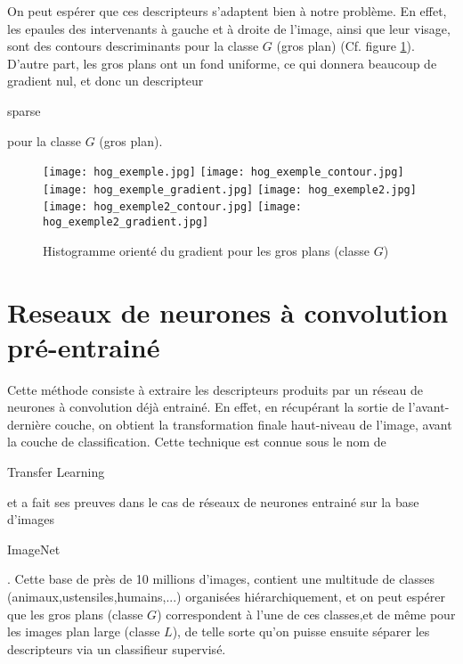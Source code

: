 \documentclass{book}
\begin{document}
On peut espérer que ces descripteurs s'adaptent bien à notre problème. En effet, les epaules des intervenants à gauche 
et à droite de l'image, ainsi que leur visage, sont des contours descriminants pour la classe $G$ (gros plan)
(Cf. figure \ref{hog_classeG}). D'autre part, les gros plans ont un fond uniforme, 
ce qui donnera beaucoup de gradient nul, et donc un descripteur \begin{itshape}sparse\end{itshape} pour la classe $G$ (gros plan).

\begin{figure}[H]
\begin{center}
\texttt{[image: hog\_exemple.jpg]}
\texttt{[image: hog\_exemple\_contour.jpg]}
\texttt{[image: hog\_exemple\_gradient.jpg]}
\texttt{[image: hog\_exemple2.jpg]}
\texttt{[image: hog\_exemple2\_contour.jpg]}
\texttt{[image: hog\_exemple2\_gradient.jpg]}
\end{center}
\caption{Histogramme orienté du gradient pour les gros plans (classe $G$)}
\label{hog_classeG}
\end{figure}

\section{Reseaux de neurones à convolution pré-entrainé}

Cette méthode consiste à extraire les descripteurs produits par un réseau de neurones à convolution déjà entrainé.
En effet, en récupérant la sortie de l'avant-dernière couche, on obtient la transformation finale haut-niveau de l'image, 
avant la couche de classification.
Cette technique est connue sous le nom de \begin{itshape}Transfer Learning\end{itshape} \cite{DBLP:journals/corr/YosinskiCBL14} 
et a fait ses preuves dans le cas de réseaux de neurones entrainé sur la base 
d'images \begin{itshape}ImageNet\end{itshape} \cite{imagenet_cvpr09}.
Cette base de près de 10 millions d'images, contient une multitude de classes (animaux,ustensiles,humains,...) organisées hiérarchiquement, 
et on peut espérer que les gros plans (classe $G$) correspondent à l'une de ces classes,et de même pour les images plan 
large (classe $L$), de telle sorte qu'on puisse ensuite séparer les descripteurs via un classifieur 
supervisé.
\end{document}
